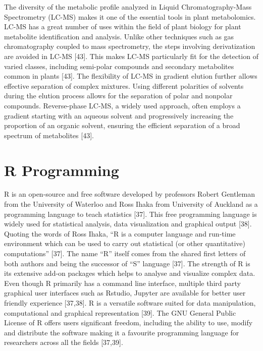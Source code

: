 \documentclass[12pt,a4paper]{report}
\begin{document}
The diversity of the metabolic profile analyzed in Liquid Chromatography-Mass Spectrometry (LC-MS) makes it one of the essential tools in plant metabolomics. LC-MS has a great number of uses within the field of plant biology for plant metabolite identification and analysis. Unlike other techniques such as gas chromatography coupled to mass spectrometry, 
the steps involving derivatization are avoided in LC-MS [43]. This makes LC-MS particularly fit for the detection of varied classes, including semi-polar compounds and secondary metabolites common in plants [43]. The flexibility of LC-MS in gradient elution further allows effective separation of complex mixtures. Using different polarities of solvents 
during the elution process allows for the separation of polar and nonpolar compounds. Reverse-phase LC-MS, a widely used approach, often employs a gradient starting with an aqueous solvent and progressively increasing the proportion of an organic solvent, ensuring the efficient separation of a broad spectrum of metabolites [43]. \\


\section{R Programming}
R is an open-source and free software developed by professors Robert Gentleman from the University of Waterloo and Ross Ihaka from University of Auckland as a programming language to teach statistics [37]. This free programming language 
is widely used for statistical analysis, data visualization and graphical output [38]. Quoting the words of Ross Ihaka, “R is a computer language and run-time environment which can be used to carry out statistical (or other quantitative) computations” [37]. 
The name “R” itself comes from the shared first letters of both authors and being the successor of “S” language [37]. The strength of R is its extensive add-on packages which helps to analyse and visualize complex data. Even though R primarily has a command 
line interface, multiple third party graphical user interfaces such as Rstudio, Jupyter are available for better user friendly experience [37,38]. R is a versatile software suited for data manipulation, computational and graphical representation [39]. The GNU General 
Public License of R offers users significant freedom, including the ability to use, modify and distribute the software making it a favourite programming language for researchers across all the fields [37,39]. \\
\end{document}
